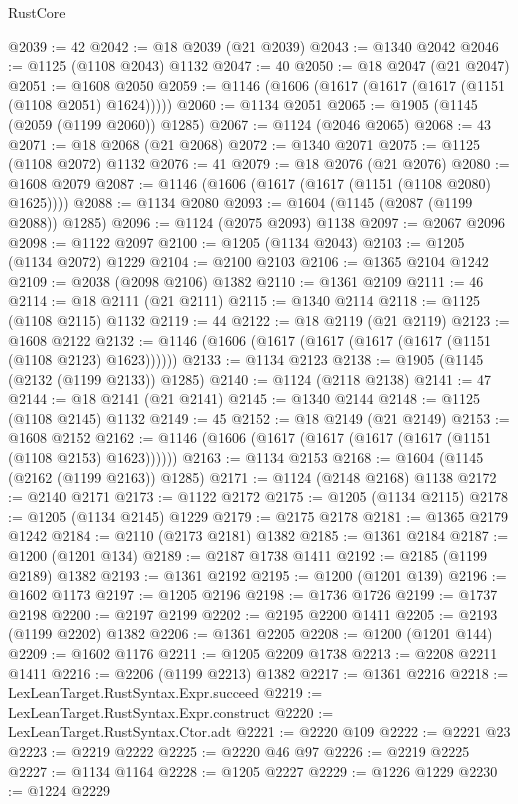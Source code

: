 \begin{lexlean}{RustCore}
\begin{coremodule}
@2039 := 42
@2042 := @18 @2039 (@21 @2039)
@2043 := @1340 @2042
@2046 := @1125 (@1108 @2043) @1132
@2047 := 40
@2050 := @18 @2047 (@21 @2047)
@2051 := @1608 @2050
@2059 := @1146 (@1606 (@1617 (@1617 (@1617 (@1151 (@1108 @2051) @1624)))))
@2060 := @1134 @2051
@2065 := @1905 (@1145 (@2059 (@1199 @2060)) @1285)
@2067 := @1124 (@2046 @2065)
@2068 := 43
@2071 := @18 @2068 (@21 @2068)
@2072 := @1340 @2071
@2075 := @1125 (@1108 @2072) @1132
@2076 := 41
@2079 := @18 @2076 (@21 @2076)
@2080 := @1608 @2079
@2087 := @1146 (@1606 (@1617 (@1617 (@1151 (@1108 @2080) @1625))))
@2088 := @1134 @2080
@2093 := @1604 (@1145 (@2087 (@1199 @2088)) @1285)
@2096 := @1124 (@2075 @2093) @1138
@2097 := @2067 @2096
@2098 := @1122 @2097
@2100 := @1205 (@1134 @2043)
@2103 := @1205 (@1134 @2072) @1229
@2104 := @2100 @2103
@2106 := @1365 @2104 @1242
@2109 := @2038 (@2098 @2106) @1382
@2110 := @1361 @2109
@2111 := 46
@2114 := @18 @2111 (@21 @2111)
@2115 := @1340 @2114
@2118 := @1125 (@1108 @2115) @1132
@2119 := 44
@2122 := @18 @2119 (@21 @2119)
@2123 := @1608 @2122
@2132 := @1146 (@1606 (@1617 (@1617 (@1617 (@1617 (@1151 (@1108 @2123) @1623))))))
@2133 := @1134 @2123
@2138 := @1905 (@1145 (@2132 (@1199 @2133)) @1285)
@2140 := @1124 (@2118 @2138)
@2141 := 47
@2144 := @18 @2141 (@21 @2141)
@2145 := @1340 @2144
@2148 := @1125 (@1108 @2145) @1132
@2149 := 45
@2152 := @18 @2149 (@21 @2149)
@2153 := @1608 @2152
@2162 := @1146 (@1606 (@1617 (@1617 (@1617 (@1617 (@1151 (@1108 @2153) @1623))))))
@2163 := @1134 @2153
@2168 := @1604 (@1145 (@2162 (@1199 @2163)) @1285)
@2171 := @1124 (@2148 @2168) @1138
@2172 := @2140 @2171
@2173 := @1122 @2172
@2175 := @1205 (@1134 @2115)
@2178 := @1205 (@1134 @2145) @1229
@2179 := @2175 @2178
@2181 := @1365 @2179 @1242
@2184 := @2110 (@2173 @2181) @1382
@2185 := @1361 @2184
@2187 := @1200 (@1201 @134)
@2189 := @2187 @1738 @1411
@2192 := @2185 (@1199 @2189) @1382
@2193 := @1361 @2192
@2195 := @1200 (@1201 @139)
@2196 := @1602 @1173
@2197 := @1205 @2196
@2198 := @1736 @1726
@2199 := @1737 @2198
@2200 := @2197 @2199
@2202 := @2195 @2200 @1411
@2205 := @2193 (@1199 @2202) @1382
@2206 := @1361 @2205
@2208 := @1200 (@1201 @144)
@2209 := @1602 @1176
@2211 := @1205 @2209 @1738
@2213 := @2208 @2211 @1411
@2216 := @2206 (@1199 @2213) @1382
@2217 := @1361 @2216
@2218 := LexLeanTarget.RustSyntax.Expr.succeed
@2219 := LexLeanTarget.RustSyntax.Expr.construct
@2220 := LexLeanTarget.RustSyntax.Ctor.adt
@2221 := @2220 @109
@2222 := @2221 @23
@2223 := @2219 @2222
@2225 := @2220 @46 @97
@2226 := @2219 @2225
@2227 := @1134 @1164
@2228 := @1205 @2227
@2229 := @1226 @1229
@2230 := @1224 @2229

\end{coremodule}
\end{lexlean}
